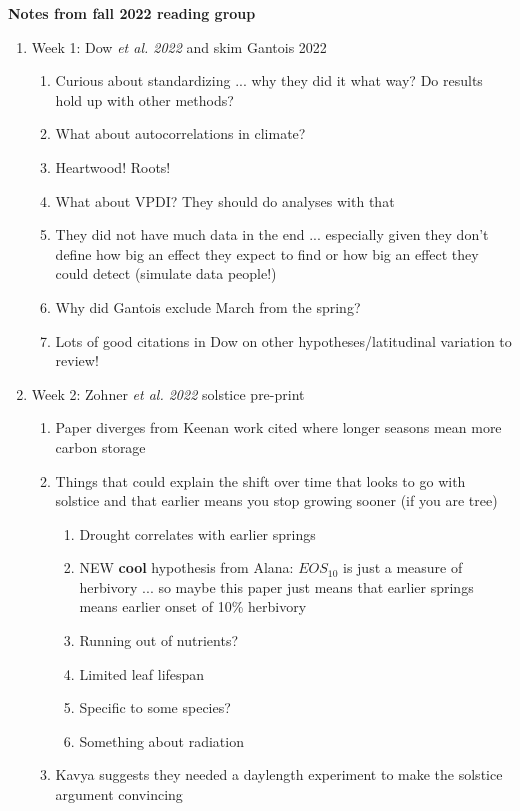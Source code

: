 \documentclass[11pt,letter]{article}
\begin{document}

\renewcommand{\refname}{\CHead{}}

{\bf Notes from fall 2022 reading group}\\
\begin{enumerate}
\item Week 1: Dow \emph{et al. 2022} and skim Gantois 2022
\begin{enumerate}
\item Curious about standardizing ... why they did it what way? Do results hold up with other methods?
\item What about autocorrelations in climate?
\item Heartwood! Roots!
\item What about VPDI? They should do analyses with that
\item They did not have much data in the end ... especially given they don't define how big an effect they expect to find or how big an effect they could detect (simulate data people!)
\item Why did Gantois exclude March from the spring?
\item Lots of good citations in Dow on other hypotheses/latitudinal variation to review!
\end{enumerate}
\item Week 2: Zohner \emph{et al. 2022} solstice pre-print
\begin{enumerate}
\item Paper diverges from Keenan work cited where longer seasons mean more carbon storage
\item Things that could explain the shift over time that looks to go with solstice and that earlier means you stop growing sooner (if you are  tree)
\begin{enumerate}
\item Drought correlates with earlier springs
\item NEW {\bf cool} hypothesis from Alana: $EOS_{10}$ is just a measure of herbivory ... so maybe this paper just means that earlier springs means earlier onset of 10\% herbivory 
\item Running out of nutrients?
\item Limited leaf lifespan
\item Specific to some species?
\item Something about radiation
\end{enumerate}
\item Kavya suggests they needed a daylength experiment to make the solstice argument convincing 

\end{enumerate}
\end{enumerate}
\end{document}
